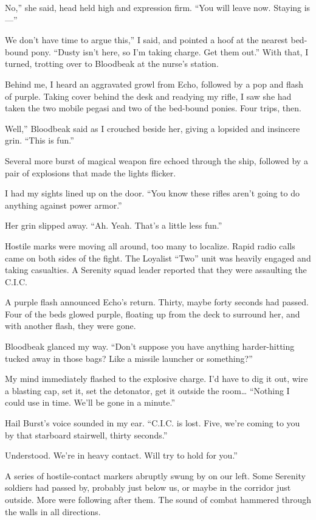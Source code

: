 \leavevmode{}No,” she said, head held high and expression firm. “You will leave now. Staying is—”

\leavevmode{}We don’t have time to argue this,” I said, and pointed a hoof at the nearest bed-bound pony. “Dusty isn’t here, so I’m taking charge. Get them out.” With that, I turned, trotting over to Bloodbeak at the nurse’s station.

Behind me, I heard an aggravated growl from Echo, followed by a pop and flash of purple. Taking cover behind the desk and readying my rifle, I saw she had taken the two mobile pegasi and two of the bed-bound ponies. Four trips, then.

\leavevmode{}Well,” Bloodbeak said as I crouched beside her, giving a lopsided and insincere grin. “This is fun.”

Several more burst of magical weapon fire echoed through the ship, followed by a pair of explosions that made the lights flicker.

I had my sights lined up on the door. “You know these rifles aren’t going to do anything against power armor.”

Her grin slipped away. “Ah. Yeah. That’s a little less fun.”

Hostile marks were moving all around, too many to localize. Rapid radio calls came on both sides of the fight. The Loyalist “Two” unit was heavily engaged and taking casualties. A Serenity squad leader reported that they were assaulting the C.I.C.

A purple flash announced Echo’s return. Thirty, maybe forty seconds had passed. Four of the beds glowed purple, floating up from the deck to surround her, and with another flash, they were gone.

Bloodbeak glanced my way. “Don’t suppose you have anything harder-hitting tucked away in those bags? Like a missile launcher or something?”

My mind immediately flashed to the explosive charge. I’d have to dig it out, wire a blasting cap, set it, set the detonator, get it outside the room… “Nothing I could use in time. We’ll be gone in a minute.”

Hail Burst’s voice sounded in my ear. “C.I.C. is lost. Five, we’re coming to you by that starboard stairwell, thirty seconds.”

\leavevmode{}Understood. We’re in heavy contact. Will try to hold for you.”

A series of hostile-contact markers abruptly swung by on our left. Some Serenity soldiers had passed by, probably just below us, or maybe in the corridor just outside. More were following after them. The sound of combat hammered through the walls in all directions.

